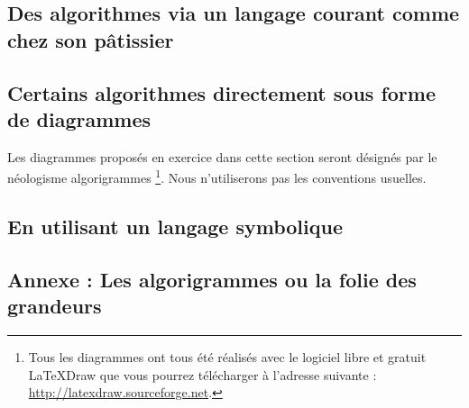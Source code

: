 \subsection{Des algorithmes via un langage courant comme chez son pâtissier}
	


\subsection{Certains algorithmes directement sous forme de diagrammes}

	Les diagrammes proposés en exercice dans cette section seront désignés par le néologisme \og algorigrammes \fg{}
	\footnote{
		Tous les diagrammes ont tous été réalisés avec le logiciel libre et gratuit
		LaTeXDraw que vous pourrez télécharger à l'adresse suivante : 
		\url{http://latexdraw.sourceforge.net}.
	}. Nous n'utiliserons pas les conventions usuelles.
	
	


\subsection{En utilisant un langage symbolique}
	


\newpage

\subsection*{Annexe : Les algorigrammes ou la folie des grandeurs}
	